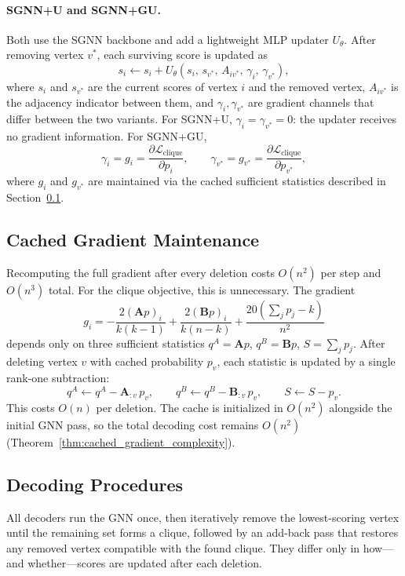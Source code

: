 \documentclass[11pt]{article}
\theoremstyle{plain}
\theoremstyle{remark}
\begin{document}
\paragraph{SGNN+U and SGNN+GU.}
Both use the SGNN backbone and add a lightweight MLP updater $U_\theta$. After
removing vertex $v^*$, each surviving score is updated as
\[
  s_i \leftarrow s_i + U_\theta(s_i,\, s_{v^*},\, A_{iv^*},\, \gamma_i,\, \gamma_{v^*}),
\]
where $s_i$ and $s_{v^*}$ are the current scores of vertex $i$ and the removed
vertex, $A_{iv^*}$ is the adjacency indicator between them, and $\gamma_i,
\gamma_{v^*}$ are gradient channels that differ between the two variants.
For SGNN+U, $\gamma_i = \gamma_{v^*} = 0$: the updater receives no gradient
information. For SGNN+GU,
\[
  \gamma_i = g_i = \frac{\partial \mathcal{L}_{\mathrm{clique}}}{\partial p_i},
  \qquad
  \gamma_{v^*} = g_{v^*} = \frac{\partial \mathcal{L}_{\mathrm{clique}}}{\partial p_{v^*}},
\]
where $g_i$ and $g_{v^*}$ are maintained via the cached sufficient statistics
described in Section~\ref{sec:cached_maintenance}.

\subsection{Cached Gradient Maintenance}
\label{sec:cached_maintenance}

Recomputing the full gradient after every deletion costs $O(n^2)$ per step and
$O(n^3)$ total. For the clique objective, this is unnecessary. The gradient
\[
  g_i = -\frac{2(\mathbf{A}p)_i}{k(k-1)}
  + \frac{2(\mathbf{B}p)_i}{k(n-k)}
  + \frac{20(\sum_j p_j - k)}{n^2}
\]
depends only on three sufficient statistics $q^A = \mathbf{A}p$, $q^B = \mathbf{B}p$,
$S = \sum_j p_j$. After deleting vertex $v$ with cached probability $p_v$, each
statistic is updated by a single rank-one subtraction:
\[
  q^A \leftarrow q^A - \mathbf{A}_{:v}\,p_v,
  \qquad
  q^B \leftarrow q^B - \mathbf{B}_{:v}\,p_v,
  \qquad
  S \leftarrow S - p_v.
\]
This costs $O(n)$ per deletion. The cache is initialized in $O(n^2)$ alongside
the initial GNN pass, so the total decoding cost remains $O(n^2)$
(Theorem~\ref{thm:cached_gradient_complexity}).

\subsection{Decoding Procedures}
\label{sec:decoding}

All decoders run the GNN once, then iteratively remove the lowest-scoring vertex
until the remaining set forms a clique, followed by an add-back pass that restores
any removed vertex compatible with the found clique. They differ only in how---and
whether---scores are updated after each deletion.
\end{document}
